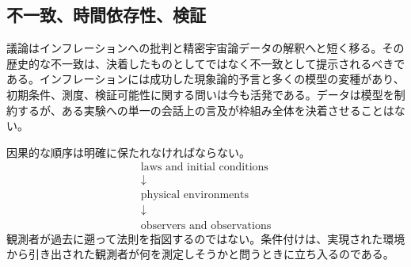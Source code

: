 \begin{classroomqa}
\end{classroomqa}

\subsection{不一致、時間依存性、検証}

議論はインフレーションへの批判と精密宇宙論データの解釈へと短く移る。その歴史的な不一致は、決着したものとしてではなく不一致として提示されるべきである。インフレーションには成功した現象論的予言と多くの模型の変種があり、初期条件、測度、検証可能性に関する問いは今も活発である。データは模型を制約するが、ある実験への単一の会話上の言及が枠組み全体を決着させることはない。

\begin{classroomqa}
\end{classroomqa}

\begin{classroomqa}
\end{classroomqa}

因果的な順序は明確に保たれなければならない。
\begin{equation}
\begin{gathered}
\text{laws and initial conditions}\\[-0.15em]
\downarrow\\[-0.15em]
\text{physical environments}\\[-0.15em]
\downarrow\\[-0.15em]
\text{observers and observations}
\end{gathered}
\end{equation}
観測者が過去に遡って法則を指図するのではない。条件付けは、実現された環境から引き出された観測者が何を測定しそうかと問うときに立ち入るのである。

